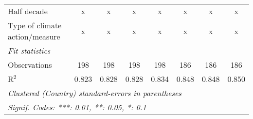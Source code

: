 \begin{tabular}{lccccccc}
   Half decade                                                                           & x              & x             & x             & x             & x              & x              & x\\  
   Type of climate action/measure                                                        & x              & x             & x             & x             & x              & x              & x\\  
   \midrule \emph{Fit statistics}\\
   Observations                                                                          & 198            & 198           & 198           & 198           & 186            & 186            & 186\\  
   R$^2$                                                                                 & 0.823          & 0.828         & 0.828         & 0.834         & 0.848          & 0.848          & 0.850\\  
   \midrule
   \multicolumn{8}{l}{\emph{Clustered (Country) standard-errors in parentheses}}\\
   \multicolumn{8}{l}{\emph{Signif. Codes: ***: 0.01, **: 0.05, *: 0.1}}\\
\end{tabular}
\par\endgroup


